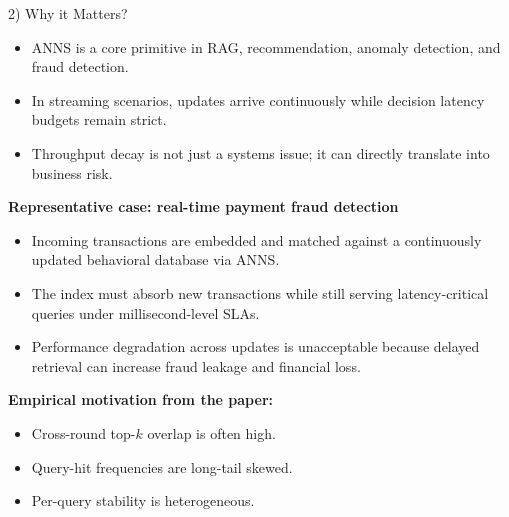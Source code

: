\documentclass[10pt,aspectratio=169]{beamer}
\begin{document}
\begin{frame}{2) Why it Matters?}
  \begin{itemize}
    \item ANNS is a core primitive in RAG, recommendation, anomaly detection, and fraud detection.
    \item In streaming scenarios, updates arrive continuously while decision latency budgets remain strict.
    \item Throughput decay is not just a systems issue; it can directly translate into business risk.
  \end{itemize}

  \vspace{0.6em}
  \textbf{Representative case: real-time payment fraud detection}
  \begin{itemize}
    \item Incoming transactions are embedded and matched against a continuously updated behavioral database via ANNS.
    \item The index must absorb new transactions while still serving latency-critical queries under millisecond-level SLAs.
    \item Performance degradation across updates is unacceptable because delayed retrieval can increase fraud leakage and financial loss.
  \end{itemize}

  \vspace{0.4em}
  \textbf{Empirical motivation from the paper:}
  \begin{itemize}
    \item Cross-round top-$k$ overlap is often high.
    \item Query-hit frequencies are long-tail skewed.
    \item Per-query stability is heterogeneous.
  \end{itemize}
\end{frame}
\end{document}
